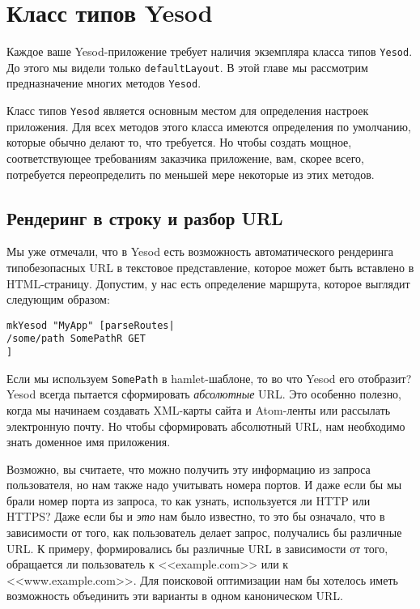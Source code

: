 \chapter {Класс типов Yesod}\label{ch:yesod-typeclass}

Каждое ваше Yesod-приложение требует наличия экземпляра класса типов \lstinline!Yesod!. До этого мы видели только \lstinline!defaultLayout!. В этой главе мы рассмотрим предназначение многих методов \lstinline!Yesod!.

Класс типов \lstinline!Yesod! является основным местом для определения настроек приложения. Для всех методов этого класса имеются определения по умолчанию, которые обычно делают то, что требуется. Но чтобы создать мощное, соответствующее требованиям заказчика приложение, вам, скорее всего, потребуется переопределить по меньшей мере некоторые из этих методов.

\section {Рендеринг в строку и разбор URL}

Мы уже отмечали, что в Yesod есть возможность автоматического рендеринга типобезопасных URL в текстовое представление, которое может быть вставлено в HTML-страницу. Допустим, у нас есть определение маршрута, которое выглядит следующим образом:

\begin{lstlisting}
mkYesod "MyApp" [parseRoutes|
/some/path SomePathR GET
]
\end{lstlisting}

Если мы используем \lstinline!SomePath! в hamlet-шаблоне, то во что Yesod его отобразит? Yesod всегда пытается сформировать \emph{абсолютные} URL. Это особенно полезно, когда мы начинаем создавать XML-карты сайта и Atom-ленты или рассылать электронную почту. Но чтобы сформировать абсолютный URL, нам необходимо знать доменное имя приложения.

Возможно, вы считаете, что можно получить эту информацию из запроса пользователя, но нам также надо учитывать номера портов. И даже если бы мы брали номер порта из запроса, то как узнать, используется ли HTTP или HTTPS? Даже если бы и \emph{это} нам было известно, то это бы означало, что в зависимости от того, как пользователь делает запрос, получались бы различные URL. К примеру, формировались бы различные URL в зависимости от того, обращается ли пользователь к <<example.com>> или к <<www.example.com>>. Для поисковой оптимизации нам бы хотелось иметь возможность объединить эти варианты в одном каноническом URL.


